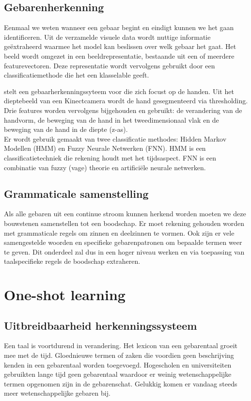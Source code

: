 \subsection{Gebarenherkenning}
Eenmaal we weten wanneer een gebaar begint en eindigt kunnen we het gaan identificeren. Uit de verzamelde visuele data wordt nuttige informatie ge\"extraheerd waarmee het model kan beslissen over welk gebaar het gaat. Het beeld wordt omgezet in een beeldrepresentatie, bestaande uit een of meerdere featurevectoren. Deze representatie wordt vervolgens gebruikt door een classificatiemethode die het een klasselable geeft.

\npar \cite{gesture-FNN-HMM} stelt een gebaarherkenningssyteem voor die zich focust op de handen. Uit het dieptebeeld van een Kinectcamera wordt de hand gesegmenteerd via thresholding. Drie features worden vervolgens bijgehouden en gebruikt: de verandering van de handvorm, de beweging van de hand in het tweedimensionaal vlak en de beweging van de hand in de diepte (z-as).
\\Er wordt gebruik gemaakt van twee classificatie methodes: Hidden Markov Modellen (HMM) en Fuzzy Neurale Netwerken (FNN). HMM is een classificatietechniek die rekening houdt met het tijdsaspect. FNN is een combinatie van fuzzy (vage) theorie en artifici\"ele neurale netwerken.

\subsection{Grammaticale samenstelling}
Als alle gebaren uit een continue stroom kunnen herkend worden moeten we deze bouwstenen samenstellen tot een boodschap. Er moet rekening gehouden worden met grammaticale regels om zinnen en deelzinnen te vormen. Ook zijn er vele samengestelde woorden en specifieke gebarenpatronen om bepaalde termen weer te geven. Dit onderdeel zal dus in een hoger niveau werken en via toepassing van taalspecifieke regels de boodschap extraheren.
%

\section{One-shot learning}

\subsection{Uitbreidbaarheid herkenningssysteem}
Een taal is voortdurend in verandering.
Het lexicon van een gebarentaal groeit mee met de tijd. Gloednieuwe termen of zaken die voordien geen beschrijving kenden in een gebarentaal worden toegevoegd. Hogescholen en universiteiten gebruikten lange tijd geen gebarentaal waardoor er weinig wetenschappelijke termen opgenomen zijn in de gebarenschat. Gelukkig komen er vandaag steeds meer wetenschappelijke gebaren bij.

